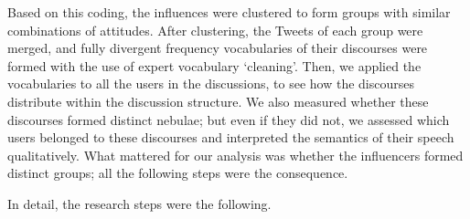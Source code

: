 Based on this coding, the influences were clustered to form groups with similar combinations of attitudes. After clustering, the Tweets of each group were merged, and fully divergent frequency vocabularies of their discourses were formed with the use of expert vocabulary ‘cleaning’. Then, we applied the vocabularies to all the users in the discussions, to see how the discourses distribute within the discussion structure. We also measured whether these discourses formed distinct nebulae; but even if they did not, we assessed which users belonged to these discourses and interpreted the semantics of their speech qualitatively. What mattered for our analysis was whether the influencers formed distinct groups; all the following steps were the consequence.

In detail, the research steps were the following.

